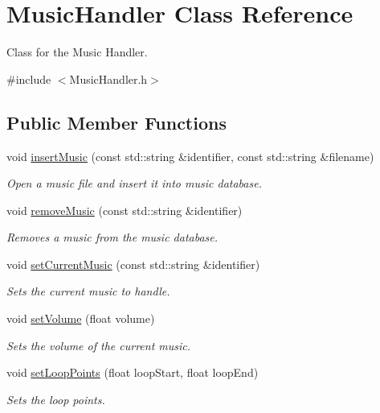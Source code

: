 \hypertarget{classMusicHandler}{}\section{Music\+Handler Class Reference}
\label{classMusicHandler}


Class for the Music Handler.  




{\ttfamily \#include $<$Music\+Handler.\+h$>$}

\subsection*{Public Member Functions}
\begin{DoxyCompactItemize}
\item 
void \mbox{\hyperlink{classMusicHandler_ad31f5fdc573d744bd3093b626e2d26e8}{insert\+Music}} (const std\+::string \&identifier, const std\+::string \&filename)
\begin{DoxyCompactList}\small\item\em Open a music file and insert it into music database. \end{DoxyCompactList}\item 
void \mbox{\hyperlink{classMusicHandler_abf4eb768fd3e6a6d03ec5d764daa2c08}{remove\+Music}} (const std\+::string \&identifier)
\begin{DoxyCompactList}\small\item\em Removes a music from the music database. \end{DoxyCompactList}\item 
void \mbox{\hyperlink{classMusicHandler_ab86705118b5abc254dcc79156a8c04b3}{set\+Current\+Music}} (const std\+::string \&identifier)
\begin{DoxyCompactList}\small\item\em Sets the current music to handle. \end{DoxyCompactList}\item 
void \mbox{\hyperlink{classMusicHandler_af76b987312116ddb40d5ae7c7bbb62d9}{set\+Volume}} (float volume)
\begin{DoxyCompactList}\small\item\em Sets the volume of the current music. \end{DoxyCompactList}\item 
void \mbox{\hyperlink{classMusicHandler_ae0c03e2b112d376e55c61f9d531dc389}{set\+Loop\+Points}} (float loop\+Start, float loop\+End)
\begin{DoxyCompactList}\small\item\em Sets the loop points. \end{DoxyCompactList}\item 

\end{DoxyCompactItemize}

